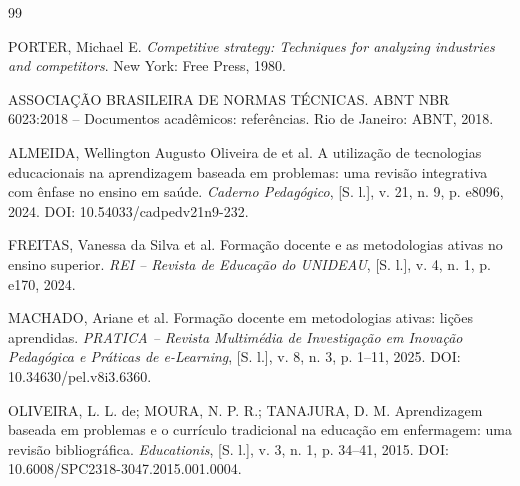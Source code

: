 \begin{thebibliography}{99}

PORTER, Michael E. \textit{Competitive strategy: Techniques for analyzing industries and competitors}. New York: Free Press, 1980.


ASSOCIAÇÃO BRASILEIRA DE NORMAS TÉCNICAS. ABNT NBR 6023:2018 -- Documentos acadêmicos: referências. Rio de Janeiro: ABNT, 2018.


ALMEIDA, Wellington Augusto Oliveira de et al. A utilização de tecnologias educacionais na aprendizagem baseada em problemas: uma revisão integrativa com ênfase no ensino em saúde. \textit{Caderno Pedagógico}, [S. l.], v. 21, n. 9, p. e8096, 2024. DOI: 10.54033/cadpedv21n9-232.

FREITAS, Vanessa da Silva et al. Formação docente e as metodologias ativas no ensino superior. \textit{REI -- Revista de Educação do UNIDEAU}, [S. l.], v. 4, n. 1, p. e170, 2024.

MACHADO, Ariane et al. Formação docente em metodologias ativas: lições aprendidas. \textit{PRATICA -- Revista Multimédia de Investigação em Inovação Pedagógica e Práticas de e-Learning}, [S. l.], v. 8, n. 3, p. 1--11, 2025. DOI: 10.34630/pel.v8i3.6360.

OLIVEIRA, L. L. de; MOURA, N. P. R.; TANAJURA, D. M. Aprendizagem baseada em problemas e o currículo tradicional na educação em enfermagem: uma revisão bibliográfica. \textit{Educationis}, [S. l.], v. 3, n. 1, p. 34--41, 2015. DOI: 10.6008/SPC2318-3047.2015.001.0004.


\end{thebibliography}
